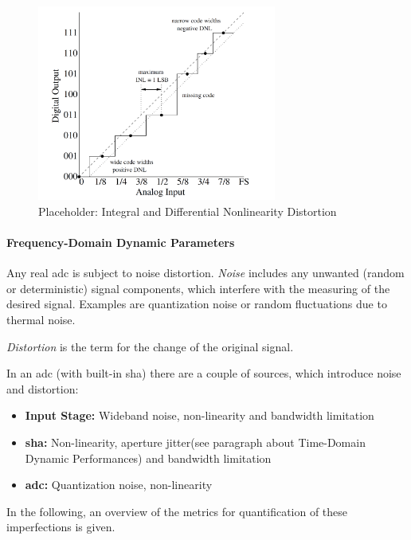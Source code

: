 \begin{figure}[tbh]
	\centering
	\includegraphics[width = 0.7\textwidth]{chap/02-theory/img/dnld}
	\caption{Placeholder: Integral and Differential Nonlinearity Distortion \cite{Lundberg}}
	\label{fig:nld}
\end{figure}

\paragraph{Frequency-Domain Dynamic Parameters}
Any real \gls{adc} is subject to noise distortion.
\textit{Noise} includes any unwanted (random or deterministic) signal components, which interfere with the measuring of the desired signal. Examples are quantization noise or random fluctuations due to thermal noise.

\textit{Distortion} is the term for the change of the original signal. %

In an \gls{adc} (with built-in \gls{sha}) there are a couple of sources, which introduce noise and distortion:
\begin{itemize}
	\item \textbf{Input Stage:} Wideband noise, non-linearity and bandwidth limitation
	\item \textbf{\gls{sha}:} Non-linearity, aperture jitter(see paragraph about Time-Domain Dynamic Performances)  and bandwidth limitation
	\item \textbf{\gls{adc}:} Quantization noise, non-linearity
\end{itemize}

In the following, an overview of the metrics for quantification of these imperfections is given. 

